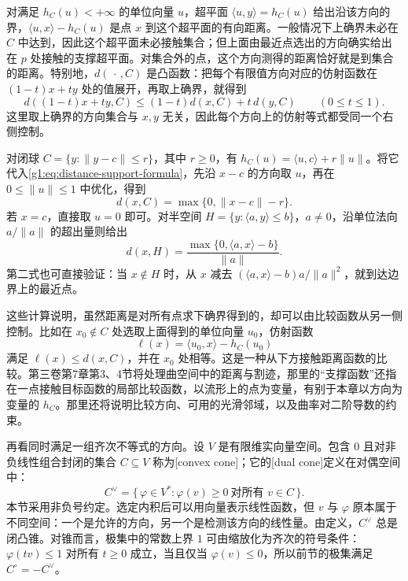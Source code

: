 对满足 \(h_C(u)<+\infty\) 的单位向量 \(u\)，超平面 \(\langle u,y\rangle=h_C(u)\) 给出沿该方向的界，\(\langle u,x\rangle-h_C(u)\) 是点 \(x\) 到这个超平面的有向距离。一般情况下上确界未必在 \(C\) 中达到，因此这个超平面未必接触集合；但上面由最近点选出的方向确实给出在 \(p\) 处接触的支撑超平面。对集合外的点，这个方向测得的距离恰好就是到集合的距离。特别地，\(d(\,\cdot\,,C)\) 是凸函数：把每个有限值方向对应的仿射函数在 \((1-t)x+ty\) 处的值展开，再取上确界，就得到
\[
	d((1-t)x+ty,C)\le(1-t)d(x,C)+t\,d(y,C)\qquad(0\le t\le1).
\]
这里取上确界的方向集合与 \(x,y\) 无关，因此每个方向上的仿射等式都受同一个右侧控制。

\begin{example}\label{g1:exm:support-distance-models}
	对闭球 \(C=\{y:\lVert y-c\rVert\le r\}\)，其中 \(r\ge0\)，有 \(h_C(u)=\langle u,c\rangle+r\lVert u\rVert\)。将它代入\eqref{g1:eq:distance-support-formula}，先沿 \(x-c\) 的方向取 \(u\)，再在 \(0\le\lVert u\rVert\le1\) 中优化，得到
	\[
		d(x,C)=\max\{0,\lVert x-c\rVert-r\}.
	\]
	若 \(x=c\)，直接取 \(u=0\) 即可。对半空间 \(H=\{y:\langle a,y\rangle\le b\}\)，\(a\ne0\)，沿单位法向 \(a/\lVert a\rVert\) 的超出量则给出
	\[
		d(x,H)=\frac{\max\{0,\langle a,x\rangle-b\}}{\lVert a\rVert}.
	\]
	第二式也可直接验证：当 \(x\notin H\) 时，从 \(x\) 减去 \((\langle a,x\rangle-b)a/\lVert a\rVert^2\)，就到达边界上的最近点。
\end{example}

这些计算说明，虽然距离是对所有点求下确界得到的，却可以由比较函数从另一侧控制。比如在 \(x_0\notin C\) 处选取上面得到的单位向量 \(u_0\)，仿射函数
\[
	\ell(x)=\langle u_0,x\rangle-h_C(u_0)
\]
满足 \(\ell(x)\le d(x,C)\)，并在 \(x_0\) 处相等。这是一种从下方接触距离函数的比较。第三卷第7章第3、4节将处理曲空间中的距离与割迹，那里的“支撑函数”还指在一点接触目标函数的局部比较函数，以流形上的点为变量，有别于本章以方向为变量的 \(h_C\)。那里还将说明比较方向、可用的光滑邻域，以及曲率对二阶导数的约束。

\ProseParagraphBreak

再看同时满足一组齐次不等式的方向。设 \(V\) 是有限维实向量空间。包含 \(0\) 且对非负线性组合封闭的集合 \(C\subseteq V\) 称为[convex cone]；它的[dual cone]定义在对偶空间中：
\[
	C^\vee=\{\,\varphi\in V^*:\varphi(v)\ge0\ \text{对所有 }v\in C\,\}.
\]
本节采用非负号约定。选定内积后可以用向量表示线性函数，但 \(v\) 与 \(\varphi\) 原本属于不同空间：一个是允许的方向，另一个是检测该方向的线性量。由定义，\(C^\vee\) 总是闭凸锥。对锥而言，极集中的常数上界 \(1\) 可由缩放化为齐次的符号条件：\(\varphi(tv)\le1\) 对所有 \(t\ge0\) 成立，当且仅当 \(\varphi(v)\le0\)，所以前节的极集满足 \(C^\circ=-C^\vee\)。

